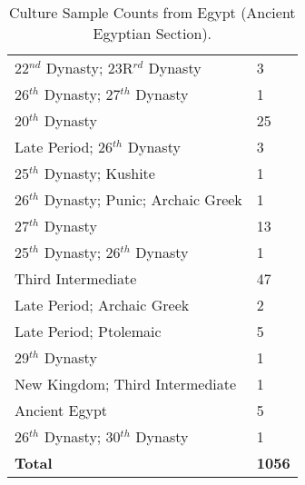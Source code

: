 \documentclass[11pt]{article}
\begin{document}
\begin{table}[ht]
\begin{tabularx}{\columnwidth}{Xl}
        22$^{nd}$  Dynasty; 23R$^{rd}$ Dynasty & 3 \\
        26$^{th}$ Dynasty; 27$^{th}$ Dynasty & 1 \\
        20$^{th}$ Dynasty & 25 \\
        Late Period; 26$^{th}$ Dynasty & 3 \\
        25$^{th}$ Dynasty; Kushite & 1 \\
        26$^{th}$ Dynasty; Punic; Archaic Greek & 1 \\
        27$^{th}$ Dynasty & 13 \\
        25$^{th}$ Dynasty; 26$^{th}$ Dynasty & 1 \\
        Third Intermediate & 47 \\
        Late Period; Archaic Greek & 2 \\
        Late Period; Ptolemaic & 5 \\
        29$^{th}$ Dynasty & 1 \\
        New Kingdom; Third Intermediate & 1 \\
        Ancient Egypt & 5 \\
        26$^{th}$ Dynasty; 30$^{th}$ Dynasty & 1 \\
        \hline
        \rowcolor{brown!10}\textbf{Total} & \textbf{1056} \\
        \hline
    \end{tabularx}
    \caption{Culture Sample Counts from Egypt (Ancient Egyptian Section).}
    \label{tab:culture-sample-egypt}
\end{table}
\end{document}
